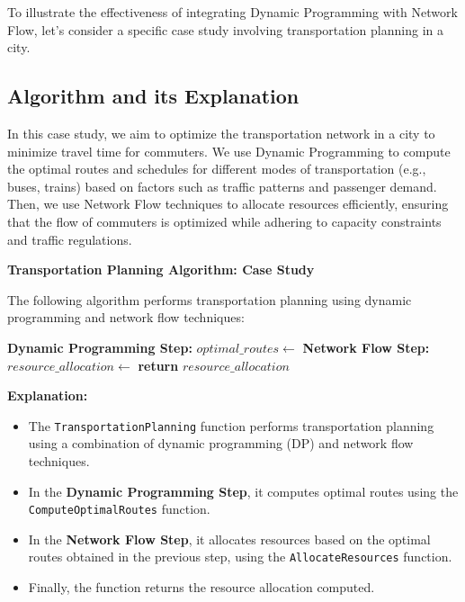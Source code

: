 \documentclass[12pt]{book} %
\begin{document}
To illustrate the effectiveness of integrating Dynamic Programming with Network Flow, let's consider a specific case study involving transportation planning in a city.

\subsection{Algorithm and its Explanation}

In this case study, we aim to optimize the transportation network in a city to minimize travel time for commuters. We use Dynamic Programming to compute the optimal routes and schedules for different modes of transportation (e.g., buses, trains) based on factors such as traffic patterns and passenger demand. Then, we use Network Flow techniques to allocate resources efficiently, ensuring that the flow of commuters is optimized while adhering to capacity constraints and traffic regulations.

\textbf{Transportation Planning Algorithm: Case Study}

The following algorithm performs transportation planning using dynamic programming and network flow techniques:
\FloatBarrier
\begin{algorithm}
\caption{Transportation Planning}\label{transportation-planning}
\begin{algorithmic}[1]
    \State \textbf{Dynamic Programming Step:}
    \State $optimal\_routes \gets$ 
    \State \textbf{Network Flow Step:}
    \State $resource\_allocation \gets$ 
    \State \textbf{return} $resource\_allocation$
\EndProcedure
\end{algorithmic}
\end{algorithm}
\FloatBarrier
\textbf{Explanation:}
\begin{itemize}
    \item The \texttt{TransportationPlanning} function performs transportation planning using a combination of dynamic programming (DP) and network flow techniques.
    \item In the \textbf{Dynamic Programming Step}, it computes optimal routes using the \texttt{ComputeOptimalRoutes} function.
    \item In the \textbf{Network Flow Step}, it allocates resources based on the optimal routes obtained in the previous step, using the \texttt{AllocateResources} function.
    \item Finally, the function returns the resource allocation computed.
\end{itemize}
\end{document}
